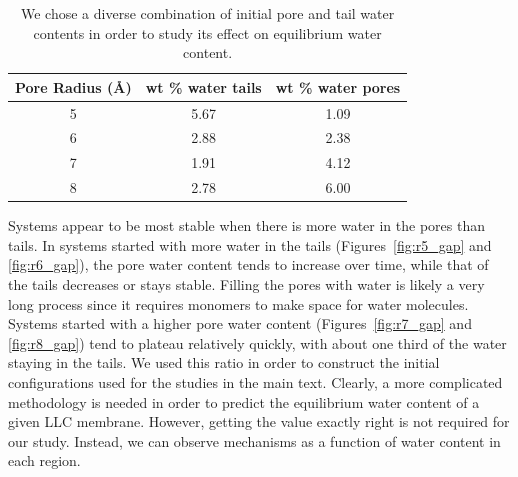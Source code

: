 \documentclass{article}
\begin{document}
  \begin{table}[!htb]
  \centering
  \begin{tabular}{|c|c|c|}
  \hline
  Pore Radius (\AA) & wt \% water tails & wt \% water pores \\
  \hline
  5                 &        5.67       &     1.09          \\
  6                 &        2.88       &     2.38          \\
  7                 &        1.91       &     4.12          \\
  8                 &        2.78       &     6.00          \\
  \hline
  \end{tabular}
  \caption{We chose a diverse combination of initial pore and tail water
  contents in order to study its effect on equilibrium water
  content.}\label{table:water_content}
  \end{table}

  Systems appear to be most stable when there is more water in the pores than
  tails. In systems started with more water in the tails
  (Figures~\ref{fig:r5_gap} and \ref{fig:r6_gap}), the pore water content tends
  to increase over time, while that of the tails decreases or stays stable.
  Filling the pores with water is likely a very long process since it requires
  monomers to make space for water molecules. Systems started with a higher pore
  water content (Figures~\ref{fig:r7_gap} and \ref{fig:r8_gap}) tend to plateau
  relatively quickly, with about one third of the water staying in the tails.  We
  used this ratio in order to construct the initial configurations used for the
  studies in the main text.  Clearly, a more complicated methodology is needed in
  order to predict the equilibrium water content of a given LLC membrane.
  However, getting the value exactly right is not required for our study.
  Instead, we can observe mechanisms as a function of water content in each
  region. 
\end{document}
